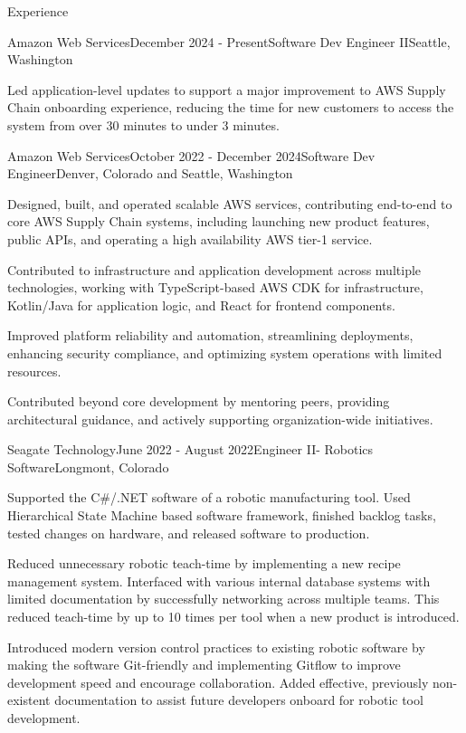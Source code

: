\documentclass{resume}
\begin{document}
  \begin{rSection}{Experience}

    \begin{rSubsection}{Amazon Web Services}{December 2024 - Present}{Software Dev Engineer II}{Seattle, Washington}
    \item Led application-level updates to support a major improvement to AWS Supply Chain onboarding experience, reducing the time for new customers to access the system from over 30 minutes to under 3 minutes.

    \end{rSubsection}

    \begin{rSubsection}{Amazon Web Services}{October 2022 - December 2024}{Software Dev Engineer}{Denver, Colorado and Seattle, Washington}
    \item Designed, built, and operated scalable AWS services, contributing end-to-end to core AWS Supply Chain systems, including launching new product features, public APIs, and operating a high availability AWS tier-1 service.
    \item Contributed to infrastructure and application development across multiple technologies, working with TypeScript-based AWS CDK for infrastructure, Kotlin/Java for application logic, and React for frontend components.
    \item Improved platform reliability and automation, streamlining deployments, enhancing security compliance, and optimizing system operations with limited resources.
    \item Contributed beyond core development by mentoring peers, providing architectural guidance, and actively supporting organization-wide initiatives.

    \end{rSubsection}

    \begin{rSubsection}{Seagate Technology}{June 2022 - August 2022}{Engineer II- Robotics Software}{Longmont, Colorado}
    \item Supported the C\#/.NET software of a robotic manufacturing tool.
    Used Hierarchical State Machine based software framework, finished backlog tasks, tested changes on hardware, and released software to production.
    \item Reduced unnecessary robotic teach-time by implementing a new recipe management system. Interfaced with various internal database systems with limited documentation by successfully networking across multiple teams. This reduced teach-time by up to 10 times per tool when a new product is introduced.
    \item Introduced modern version control practices to existing robotic software by making the software Git-friendly and implementing Gitflow to improve development speed and encourage collaboration. Added effective, previously non-existent documentation to assist future developers onboard for robotic tool development.
    \end{rSubsection}


\end{rSection}
\end{document}
